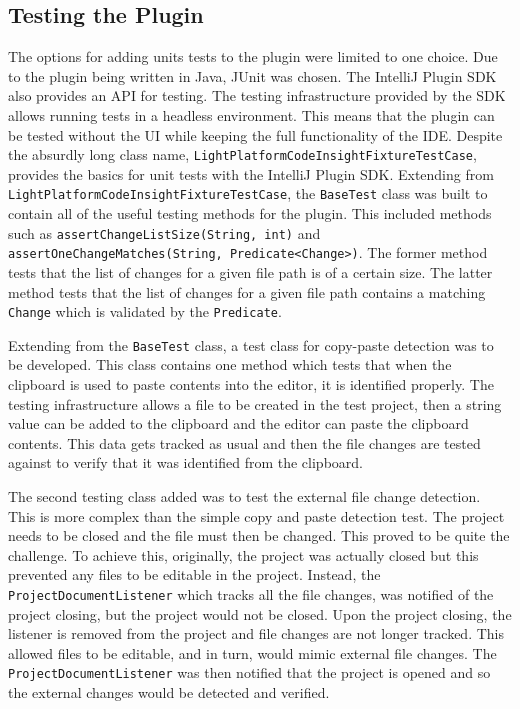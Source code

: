 \subsection{Testing the Plugin}
The options for adding units tests to the plugin were limited to one choice. Due to the plugin being written in Java, JUnit was chosen. The IntelliJ Plugin SDK also provides an API for testing. The testing infrastructure provided by the SDK allows running tests in a headless environment. This means that the plugin can be tested without the UI while keeping the full functionality of the IDE. Despite the absurdly long class name, \texttt{LightPlatformCodeInsightFixtureTestCase}, provides the basics for unit tests with the IntelliJ Plugin SDK. Extending from \texttt{LightPlatformCodeInsightFixtureTestCase}, the \texttt{BaseTest} class was built to contain all of the useful testing methods for the plugin. This included methods such as \texttt{assertChangeListSize(String, int)} and \texttt{assertOneChangeMatches(String, Predicate<Change>)}. The former method tests that the list of changes for a given file path is of a certain size. The latter method tests that the list of changes for a given file path contains a matching \texttt{Change} which is validated by the \texttt{Predicate}.

Extending from the \texttt{BaseTest} class, a test class for copy-paste detection was to be developed. This class contains one method which tests that when the clipboard is used to paste contents into the editor, it is identified properly. The testing infrastructure allows a file to be created in the test project, then a string value can be added to the clipboard and the editor can paste the clipboard contents. This data gets tracked as usual and then the file changes are tested against to verify that it was identified from the clipboard.

The second testing class added was to test the external file change detection. This is more complex than the simple copy and paste detection test. The project needs to be closed and the file must then be changed. This proved to be quite the challenge. To achieve this, originally, the project was actually closed but this prevented any files to be editable in the project. Instead, the \texttt{ProjectDocumentListener} which tracks all the file changes, was notified of the project closing, but the project would not be closed. Upon the project closing, the listener is removed from the project and file changes are not longer tracked. This allowed files to be editable, and in turn, would mimic external file changes. The \texttt{ProjectDocumentListener} was then notified that the project is opened and so the external changes would be detected and verified.

